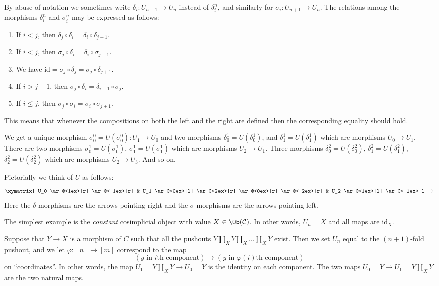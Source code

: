 \begin{remark}
\label{remark-relations-cosimplicial}
By abuse of notation we sometimes write $\delta_i : U_{n - 1} \to U_n$
instead of $\delta^n_i$, and similarly for $\sigma_i : U_{n + 1} \to U_n$.
The relations among the morphisms $\delta^n_i$ and $\sigma^n_i$
may be expressed as follows:
\begin{enumerate}
\item If $i < j$, then
$\delta_j \circ \delta_i = \delta_i \circ \delta_{j - 1}$.
\item If $i < j$, then
$\sigma_j \circ \delta_i = \delta_i \circ \sigma_{j - 1}$.
\item We have
$\text{id} = \sigma_j \circ \delta_j = \sigma_j \circ \delta_{j + 1}$.
\item If $i > j + 1$, then
$\sigma_j \circ \delta_i = \delta_{i - 1} \circ \sigma_j$.
\item If $i \leq j$, then
$\sigma_j \circ \sigma_i = \sigma_i \circ \sigma_{j + 1}$.
\end{enumerate}
This means that whenever the compositions on both the left and the
right are defined then the corresponding equality should hold.
\end{remark}

\noindent
We get a unique morphism $\sigma^0_0 = U(\sigma^0_0) : U_1 \to U_0$ and
two morphisms $\delta^1_0 = U(\delta^1_0)$, and
$\delta^1_1 = U(\delta^1_1)$ which are morphisms $U_0 \to U_1$.
There are two morphisms
$\sigma^1_0 = U(\sigma^1_0)$, $\sigma^1_1 = U(\sigma^1_1)$
which are morphisms $U_2 \to U_1$. Three morphisms
$\delta^2_0 = U(\delta^2_0)$, $\delta^2_1 = U(\delta^2_1)$,
$\delta^2_2 = U(\delta^2_2)$
which are morphisms $U_2 \to U_3$. And so on.

\medskip\noindent
Pictorially we think of $U$ as follows:
$$
\xymatrix{
U_0
\ar@<1ex>[r]
\ar@<-1ex>[r]
&
U_1
\ar@<0ex>[l]
\ar@<2ex>[r]
\ar@<0ex>[r]
\ar@<-2ex>[r]
&
U_2
\ar@<1ex>[l]
\ar@<-1ex>[l]
}
$$
Here the $\delta$-morphisms are the arrows pointing right and the
$\sigma$-morphisms are the arrows pointing left.

\begin{example}
\label{example-constant-cosimplicial-object}
The simplest example is the {\it constant} cosimplicial object with
value $X \in \Ob(\mathcal{C})$. In other words, $U_n = X$ and
all maps are $\text{id}_X$.
\end{example}

\begin{example}
\label{example-push-outs-simplicial-object}
Suppose that $Y\to X$ is a morphism of $C$ such that all
the pushouts $Y\coprod_X Y \coprod_X \ldots \coprod_X Y$ exist.
Then we set $U_n$ equal to the $(n + 1)$-fold pushout,
and we let $\varphi : [n] \to [m]$ correspond to the map
$$
(y \text{ in }i\text{th component})
\mapsto
(y \text{ in }\varphi(i)\text{th component})
$$
on ``coordinates''.
In other words, the map $U_1 = Y \coprod_X Y \to U_0 = Y$ is the
identity on each component.
The two maps $U_0 = Y \to U_1 = Y \coprod_X Y$ are the two
natural maps.
\end{example}


